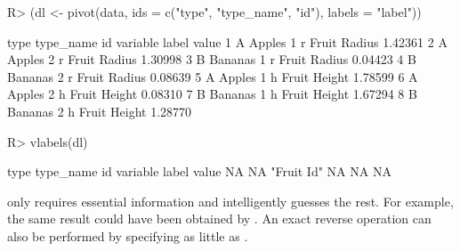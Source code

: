 \documentclass[article]{jss}
\newcommand{\fct}[1]{\code{#1()}}
\begin{document}
\begin{Schunk}
\begin{Sinput}
R> (dl <- pivot(data, ids = c("type", "type_name", "id"), labels = "label"))
\end{Sinput}
\begin{Soutput}
  type type_name id variable        label   value
1    A    Apples  1        r Fruit Radius 1.42361
2    A    Apples  2        r Fruit Radius 1.30998
3    B   Bananas  1        r Fruit Radius 0.04423
4    B   Bananas  2        r Fruit Radius 0.08639
5    A    Apples  1        h Fruit Height 1.78599
6    A    Apples  2        h Fruit Height 0.08310
7    B   Bananas  1        h Fruit Height 1.67294
8    B   Bananas  2        h Fruit Height 1.28770
\end{Soutput}
\begin{Sinput}
R> vlabels(dl)
\end{Sinput}
\begin{Soutput}
      type  type_name         id   variable      label      value 
        NA         NA "Fruit Id"         NA         NA         NA 
\end{Soutput}
\end{Schunk}
%
\fct{pivot} only requires essential information and intelligently guesses the rest. For example, the same result could have been obtained by . An exact reverse operation can also be performed by specifying as little as . \newline
\end{document}

